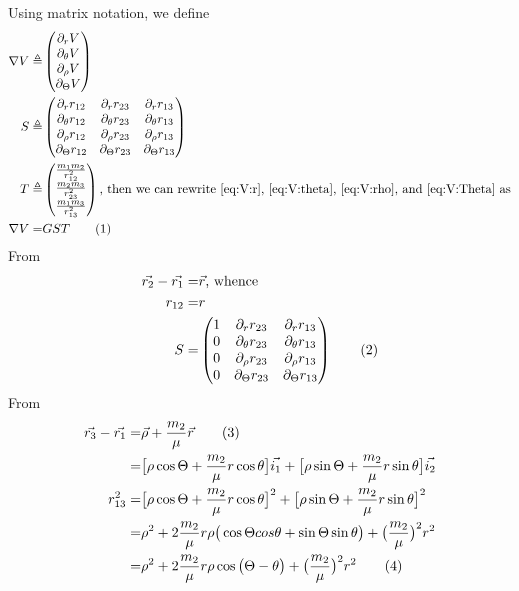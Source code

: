 \documentclass[]{article}
\newcommand\numberthis{\addtocounter{equation}{1}\tag{\theequation}}
\begin{document}
Using matrix notation, we define
\begin{align*}
	\nabla V \triangleq& \begin{pmatrix}
		\partial_r V\\
		\partial_{\theta} V\\
		\partial_{\rho} V\\
		\partial_{\Theta} V
	\end{pmatrix}\\
	S \triangleq& \begin{pmatrix}
		\partial_r r_{12}& \partial_r r_{23} & \partial_r r_{13}\\
		\partial_{\theta} r_{12}& \partial_{\theta} r_{23} & \partial_{\theta} r_{13}\\
		\partial_{\rho} r_{12}& \partial_{\rho} r_{23} & \partial_{\rho} r_{13}\\
		\partial_{\Theta} r_{12}& \partial_{\Theta} r_{23} & \partial_{\Theta} r_{13}
	\end{pmatrix}\\
	T \triangleq& \begin{pmatrix}
		\frac{m_1 m_2}{r_{12}^2}\\
		\frac{m_2 m_3}{r_{23}^2}\\
		\frac{m_1 m_3}{r_{13}^2} 		
	\end{pmatrix}\text{, then we can rewrite \eqref{eq:V:r}, \eqref{eq:V:theta}, \eqref{eq:V:rho}, and \eqref{eq:V:Theta} as}\\
	\nabla V =& G S T \numberthis \label{eq:V:S:T}
\end{align*}
From  \cite[(27a)]{kotovych2002exactly}
\begin{align*}
	\vec{r_2} - \vec{r_1} =& \vec{r} \text{, whence}\\
	r_{12} =& r \\
		S =& \begin{pmatrix}
		1& \partial_r r_{23} & \partial_r r_{13}\\
		0& \partial_{\theta} r_{23} & \partial_{\theta} r_{13}\\
		0& \partial_{\rho} r_{23} & \partial_{\rho} r_{13}\\
		0& \partial_{\Theta} r_{23} & \partial_{\Theta} r_{13}
	\end{pmatrix} \numberthis \label{eq:S:1}
\end{align*}
From  \cite[(27b)]{kotovych2002exactly}
\begin{align*}
	\vec{r_3} - \vec{r_1} =& \vec{\rho} + \frac{m_2}{\mu}\vec{r} \numberthis \label{eq_r3_r1}\\
	=&\big[\rho \cos{\Theta}+\frac{m_2}{\mu}r \cos{\theta}\big] \vec{i_1} +\big[\rho \sin{\Theta}+\frac{m_2}{\mu}r \sin{\theta}\big] \vec{i_2}\\
	r_{13}^2 =& \big[\rho \cos{\Theta}+\frac{m_2}{\mu}r \cos{\theta}\big]^2 + \big[\rho \sin{\Theta}+\frac{m_2}{\mu}r \sin{\theta}\big]^2\\
	=&  \rho^2 + 2 \frac{m_2}{\mu} r \rho \big(\cos{\Theta}cos{\theta}+\sin{\Theta}\sin{\theta}\big) +\big(\frac{m_2}{\mu}\big)^2r^2 \\
	=&  \rho^2 + 2 \frac{m_2}{\mu} r \rho \cos{\big(\Theta-\theta\big)} +\big(\frac{m_2}{\mu}\big)^2r^2\numberthis \label{eq:r_3:r_1} 
\end{align*}
\end{document}
